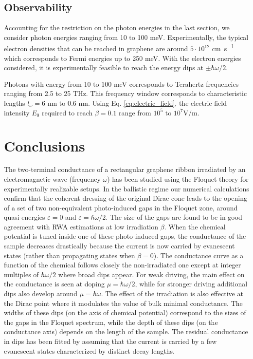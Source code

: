 \documentclass[aps,prb,showpacs,superscriptaddress,twocolumn,10pt,floatfix]{revtex4-1}
\newcommand{\ep}{\varepsilon}
\begin{document}
\subsection{Observability}

Accounting for the restriction on the photon energies in the last section, we consider photon energies ranging from 10 to 100 meV.
%
Experimentally, the typical electron densities that can be reached in graphene are around $5\cdot10^{12}$ \si{\centi\meter\per\second} which corresponds to Fermi energies up to 250 meV. With the electron energies considered, it is experimentally feasible to reach the energy dips at $\pm\hbar\omega/2$.
%

Photons with energy from 10 to 100 meV corresponds to Terahertz frequencies ranging from 2.5 to 25 THz. This frequency window corresponds to characteristic lengths $l_\omega=6$ nm to 0.6 nm. Using Eq. \ref{eq:electric_field}, the electric field intensity $E_0$ required to reach $\beta=0.1$ range from $10^5$ to $10^7\si{\volt\per\meter}$.




\section{Conclusions}

\label{sec:conclusions}

The two-terminal conductance of a rectangular graphene ribbon irradiated by an electromagnetic wave (frequency $\omega$) has been studied using the Floquet theory for experimentally realizable setups. In the ballistic regime our numerical calculations confirm that the coherent dressing of the original Dirac cone leads to the opening of a set of two non-equivalent photo-induced gaps in the Floquet zone, around quasi-energies $\ep=0$ and $\ep=\hbar\omega/2$. The size of the gaps are found to be in good agreement with RWA estimations\cite{Zhou2011} at low irradiation $\beta$. 
When the chemical potential is tuned inside one of these photo-induced gaps, the conductance of the sample decreases drastically because the current is now carried by evanescent states (rather than propagating states when $\beta=0$). The conductance curve as a function of the chemical follows closely the non-irradiated one except at integer multiples of $\hbar\omega/2$ where broad dips appear. For weak driving, the main effect on the conductance is seen at doping $\mu=\hbar\omega/2$, while for stronger driving additional dips also develop around $\mu=\hbar\omega$. The effect of the irradiation is also effective at the Dirac point where it modulates the value of bulk minimal conductance. The widths of these dips (on the axis of chemical potential) correspond to the sizes of the gaps in the Floquet spectrum, while the depth of these dips (on the conductance axis) depends on the length of the sample. The residual conductance in dips has been fitted by assuming that the current is carried by a few evanescent states characterized by distinct decay lengths. 
\end{document}
